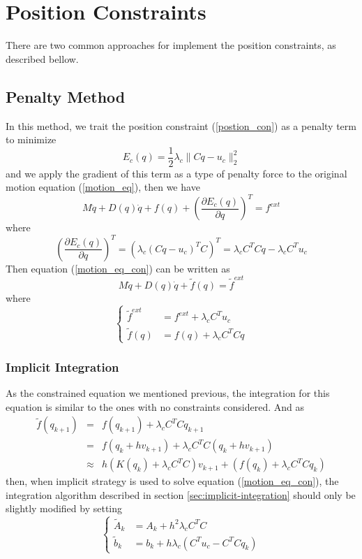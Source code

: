 \documentclass[twocolumn]{article}
\begin{document}
\section{Position Constraints}
There are two common approaches for implement the position constraints, as
described bellow.
\subsection{Penalty Method}
In this method, we trait the position constraint (\ref{postion_con}) as a
penalty term to minimize
\[
E_c(q) = \frac{1}{2}\lambda_c \|Cq-u_c\|^2_2
\]
and we apply the gradient of this term as a type of penalty force to the
original motion equation (\ref{motion_eq}), then we have
\begin{equation} \label{motion_eq_con}
   M\ddot{q} + D(q)\dot{q} + f(q) + (\frac{\partial{E_c(q)}}{\partial{q}})^T=
   f^{ext}
\end{equation}
where 
\[
(\frac{\partial{E_c(q)}}{\partial{q}})^T = (\lambda_c(Cq-u_c)^TC)^T =
\lambda_cC^TC q - \lambda_c C^Tu_c
\]
Then equation (\ref{motion_eq_con}) can be written as 
\[
  M\ddot{q} + D(q)\dot{q} +  \tilde{f}(q) = \tilde{f} ^{ext} 
\]
where
\[
\left\{ \begin{array}{rl}
    \tilde{f}^{ext} &= {f}^{ext} + \lambda_cC^Tu_c \\
    \tilde{f}(q) &= f(q)+\lambda_cC^TCq
  \end{array} \right.\nonumber
\]

\subsubsection{Implicit Integration}
As the constrained equation we mentioned previous, the integration for this
equation is similar to the ones with no constraints considered. And as
\begin{eqnarray}
\tilde{f}(q _{k+1} ) &=&  f(q _{k+1}) + \lambda_cC^TC q _{k+1} \nonumber \\
&=& f(q _{k} + hv _{k+1} ) + \lambda_cC^TC (q _{k} + hv _{k+1}) \nonumber \\
&\approx&  h(K(q_k)+\lambda_c C^TC )v _{k+1} + (f(q_k)+\lambda_cC^TCq_k) \nonumber
\end{eqnarray}
then, when implicit strategy is used to solve equation (\ref{motion_eq_con}),
the integration algorithm described in section \ref{sec:implicit-integration}
should only be slightly modified by setting
\[
\left\{ \begin{array}{rl}
    \tilde{A}_k &= A_k + h^2\lambda_cC^TC\\
    \tilde{b}_k &= b_k + h\lambda_c(C^Tu_c - C^TCq_k)
  \end{array} \right.\nonumber
\]
\end{document}
